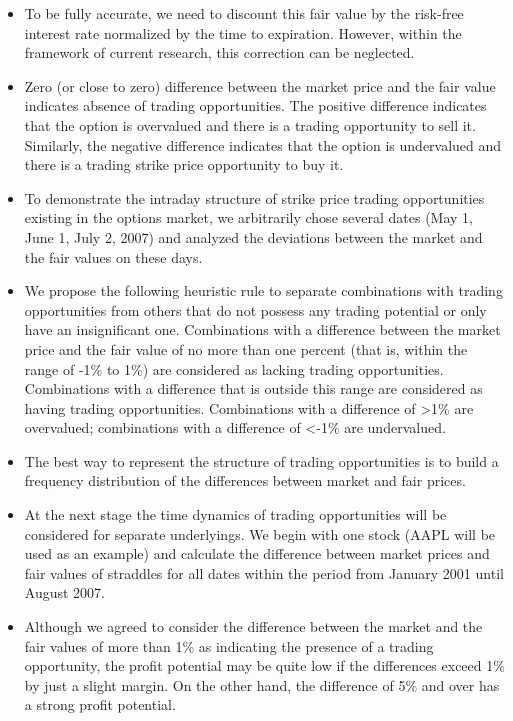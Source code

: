 \begin{itemize}
            \item To be fully accurate, we need to discount this fair value by the risk-free interest rate normalized by the time to expiration. However, within the framework of current research, this correction can be neglected.
            \item Zero (or close to zero) difference between the market price and the fair value indicates absence of trading opportunities. The positive difference indicates that the option is overvalued and there is a trading opportunity to sell it. Similarly, the negative difference indicates that the option is undervalued and there is a trading strike price opportunity to buy it.
            \item To demonstrate the intraday structure of strike price trading opportunities existing in the options market, we arbitrarily chose several dates (May 1, June 1, July 2, 2007) and analyzed the deviations between the market and the fair values on these days.
            \item We propose the following heuristic rule to separate combinations with trading opportunities from others that do not possess any trading potential or only have an insignificant one.
                \subitem Combinations with a difference between the market price and the fair value of no more than one percent (that is, within the range of -1\% to 1\%) are considered as lacking trading opportunities.
                \subitem Combinations with a difference that is outside this range are considered as having trading opportunities. Combinations with a difference of >1\% are overvalued; combinations with a difference of <-1\% are undervalued.
            \item The best way to represent the structure of trading opportunities is to build a frequency distribution of the differences between market and fair prices.
            \item At the next stage the time dynamics of trading opportunities will be considered for separate underlyings. We begin with one stock (AAPL will be used as an example) and calculate the difference between market prices and fair values of straddles for all dates within the period from January 2001 until August 2007.
            \item Although we agreed to consider the difference between the market and the fair values of more than 1\% as indicating the presence of a trading opportunity, the profit potential may be quite low if the differences exceed 1\% by just a slight margin. On the other hand, the difference of 5\% and over has a strong profit potential.

\end{itemize}
